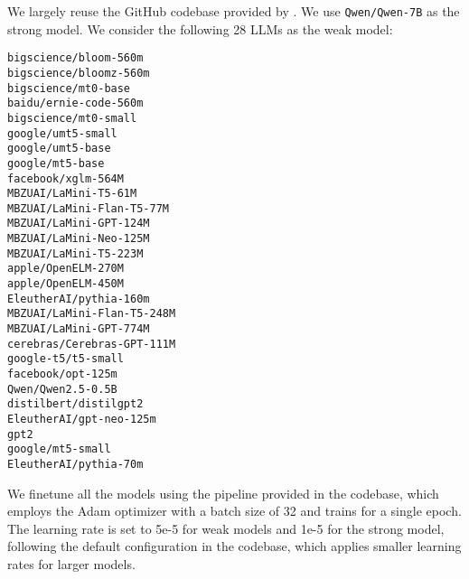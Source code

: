 We largely reuse the GitHub codebase provided by \cite{burns2023weak}. We use \texttt{Qwen/Qwen-7B} as the strong model. We consider the following 28 LLMs as the weak model: 
\begin{tabbing}
\texttt{bigscience/bloom-560m} \\
\texttt{bigscience/bloomz-560m} \\
\texttt{bigscience/mt0-base} \\
\texttt{baidu/ernie-code-560m} \\
\texttt{bigscience/mt0-small} \\
\texttt{google/umt5-small} \\
\texttt{google/umt5-base} \\
\texttt{google/mt5-base} \\
\texttt{facebook/xglm-564M} \\
\texttt{MBZUAI/LaMini-T5-61M} \\
\texttt{MBZUAI/LaMini-Flan-T5-77M} \\
\texttt{MBZUAI/LaMini-GPT-124M} \\
\texttt{MBZUAI/LaMini-Neo-125M} \\
\texttt{MBZUAI/LaMini-T5-223M} \\
\texttt{apple/OpenELM-270M} \\
\texttt{apple/OpenELM-450M} \\
\texttt{EleutherAI/pythia-160m} \\
\texttt{MBZUAI/LaMini-Flan-T5-248M} \\
\texttt{MBZUAI/LaMini-GPT-774M} \\
\texttt{cerebras/Cerebras-GPT-111M} \\
\texttt{google-t5/t5-small} \\
\texttt{facebook/opt-125m} \\
\texttt{Qwen/Qwen2.5-0.5B} \\
\texttt{distilbert/distilgpt2} \\
\texttt{EleutherAI/gpt-neo-125m} \\
\texttt{gpt2} \\
\texttt{google/mt5-small} \\
\texttt{EleutherAI/pythia-70m}
\end{tabbing}
We finetune all the models using the pipeline provided in the codebase, which employs the Adam optimizer with a batch size of 32 and trains for a single epoch. The learning rate is set to 5e-5 for weak models and 1e-5 for the strong model, following the default configuration in the codebase, which applies smaller learning rates for larger models.

